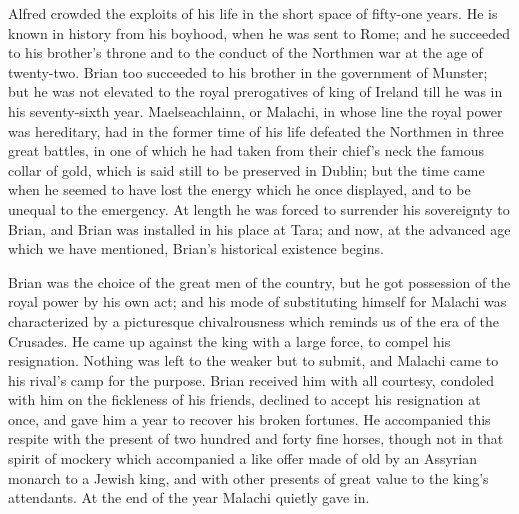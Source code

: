 Alfred crowded the exploits of
his life in the short space of fifty-one years. He is known in history
from his boyhood, when he was sent to Rome; and he succeeded to his
brother's throne and to the conduct of the Northmen war at the age of
twenty-two. Brian too succeeded to his brother in the government of
Munster; but he was not elevated to the royal prerogatives of king of
Ireland till he was in his seventy-sixth year. Maelseachlainn, or
Malachi, in whose line the royal power was hereditary, had in the
former time of his life defeated the Northmen in three great battles,
in one of which he had taken from their chief's neck the famous collar
of gold, which is said still to be preserved in Dublin; but the time
came when he seemed to have lost the energy which he once displayed,
and to be unequal to the emergency. At length he was forced to
surrender his sovereignty to Brian, and Brian was installed in his
place at Tara; and now, at the advanced age which we have mentioned,
Brian's historical existence begins.

Brian was the choice of the
great men of the country, but he got possession of the royal power by
his own act; and his mode of substituting himself for Malachi
was characterized by a picturesque chivalrousness which reminds us of
the era of the Crusades. He came up against the king with a large
force, to compel his resignation. Nothing was left to the weaker but
to submit, and Malachi came to his rival's camp for the purpose. Brian
received him with all courtesy, condoled with him on the fickleness of
his friends, declined to accept his resignation at once, and gave him
a year to recover his broken fortunes. He accompanied this respite
with the present of two hundred and forty fine horses, though not in
that spirit of mockery which accompanied a like offer made of old by
an Assyrian monarch to a Jewish king, and with other presents of great
value to the king's attendants. At the end of the year Malachi quietly
gave in.

